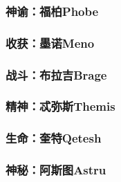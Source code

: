 \documentclass{ctexart}
\begin{document}
			\subsubsection{神谕：福柏Phobe}
			\subsubsection{收获：墨诺Meno}
			\subsubsection{战斗：布拉吉Brage}
			\subsubsection{精神：忒弥斯Themis}
			\subsubsection{生命：奎特Qetesh}
			\subsubsection{神秘：阿斯图Astru}
\end{document}
